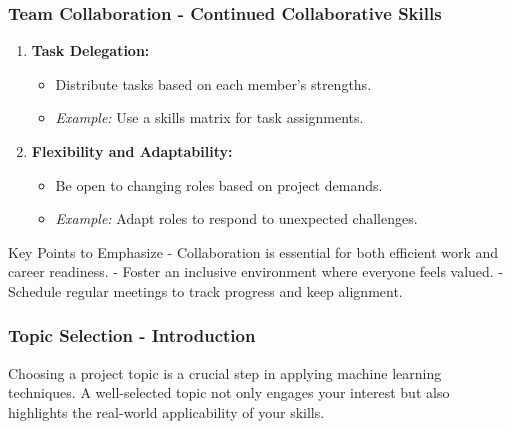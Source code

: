 \documentclass[aspectratio=169]{beamer}
\begin{document}
\begin{frame}[fragile]
    \frametitle{Team Collaboration - Continued Collaborative Skills}

    \begin{enumerate}[resume]
        \item \textbf{Task Delegation:}
            \begin{itemize}
                \item Distribute tasks based on each member's strengths.
                \item \emph{Example:} Use a skills matrix for task assignments.
            \end{itemize}
        \item \textbf{Flexibility and Adaptability:}
            \begin{itemize}
                \item Be open to changing roles based on project demands.
                \item \emph{Example:} Adapt roles to respond to unexpected challenges.
            \end{itemize}
    \end{enumerate}
    
    \begin{block}{Key Points to Emphasize}
        - Collaboration is essential for both efficient work and career readiness.
        - Foster an inclusive environment where everyone feels valued.
        - Schedule regular meetings to track progress and keep alignment.
    \end{block}
\end{frame}

\begin{frame}[fragile]
    \frametitle{Topic Selection - Introduction}
    Choosing a project topic is a crucial step in applying machine learning techniques. A well-selected topic not only engages your interest but also highlights the real-world applicability of your skills.
\end{frame}
\end{document}

